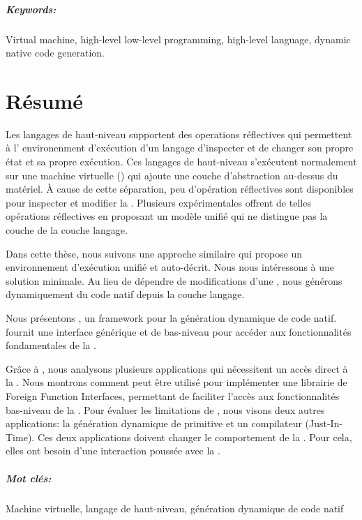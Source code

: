 \documentclass[a4paper,11pt,twoside]{include/ThesisStyle}
\begin{document}
\paragraph{Keywords:} Virtual machine, high-level low-level programming, high-level language, dynamic native code generation.

\chapter*{Résumé}
Les langages de haut-niveau supportent des operations réflectives qui permettent à l’ environenment d’exécution d’un langage d’inspecter et de changer son propre état et sa propre exécution.
Ces langages de haut-niveau s’exécutent normalement sur une machine virtuelle (\VM) qui ajoute une couche d’abstraction au-dessus du matériel.
À cause de cette séparation, peu d’opération réflectives sont disponibles pour inspecter et modifier la \VM.
Plusieurs \VMs expérimentales offrent de telles opérations réflectives en proposant un modèle unifié qui ne distingue pas la couche \VM de la couche langage. 

Dans cette thèse, nous suivons une approche similaire qui propose un environnement d’exécution unifié et auto-décrit.
Nous nous intéressons à une solution minimale.
Au lieu de dépendre de modifications d’une \VM, nous générons dynamiquement du code natif depuis la couche langage. 

Nous présentons \B, un framework pour la génération dynamique de code natif.
\B fournit une interface générique et de bas-niveau pour accéder aux fonctionnalités fondamentales de la \VM.

Grâce à \B, nous analysons plusieurs applications qui nécessitent un accès direct à la \VM.
Nous montrons comment \B peut être utilisé pour implémenter une librairie de Foreign Function Interfaces, permettant de faciliter l’accès aux fonctionnalités bas-niveau de la \VM.
Pour évaluer les limitations de \B, nous visons deux autres applications: la génération dynamique de primitive et un compilateur \JIT (Just-In-Time).
Ces deux applications doivent changer le comportement de la \VM.
Pour cela, elles ont besoin d’une interaction poussée avec la \VM.

\paragraph{Mot clés:} Machine virtuelle, langage de haut-niveau, génération dynamique de code natif
 
\end{document}
